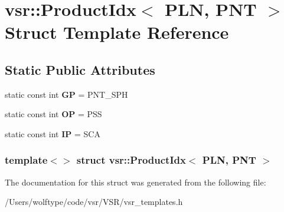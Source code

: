 \hypertarget{structvsr_1_1_product_idx_3_01_p_l_n_00_01_p_n_t_01_4}{\section{vsr\-:\-:Product\-Idx$<$ P\-L\-N, P\-N\-T $>$ Struct Template Reference}
\label{structvsr_1_1_product_idx_3_01_p_l_n_00_01_p_n_t_01_4}
}
\subsection*{Static Public Attributes}
\begin{DoxyCompactItemize}
\item 
\hypertarget{structvsr_1_1_product_idx_3_01_p_l_n_00_01_p_n_t_01_4_a31fe8c4686134a6463f828cb4e5194da}{static const int {\bfseries G\-P} = P\-N\-T\-\_\-\-S\-P\-H}\label{structvsr_1_1_product_idx_3_01_p_l_n_00_01_p_n_t_01_4_a31fe8c4686134a6463f828cb4e5194da}

\item 
\hypertarget{structvsr_1_1_product_idx_3_01_p_l_n_00_01_p_n_t_01_4_a534e1c9f6ed26cb66b80bc9bf0f0b480}{static const int {\bfseries O\-P} = P\-S\-S}\label{structvsr_1_1_product_idx_3_01_p_l_n_00_01_p_n_t_01_4_a534e1c9f6ed26cb66b80bc9bf0f0b480}

\item 
\hypertarget{structvsr_1_1_product_idx_3_01_p_l_n_00_01_p_n_t_01_4_a60c0079eddbaffee2a1a2c1b557b2f23}{static const int {\bfseries I\-P} = S\-C\-A}\label{structvsr_1_1_product_idx_3_01_p_l_n_00_01_p_n_t_01_4_a60c0079eddbaffee2a1a2c1b557b2f23}

\end{DoxyCompactItemize}
\subsubsection*{template$<$$>$ struct vsr\-::\-Product\-Idx$<$ P\-L\-N, P\-N\-T $>$}



The documentation for this struct was generated from the following file\-:\begin{DoxyCompactItemize}
\item 
/\-Users/wolftype/code/vsr/\-V\-S\-R/vsr\-\_\-templates.\-h\end{DoxyCompactItemize}
